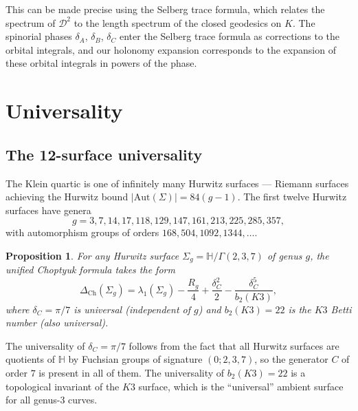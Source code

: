 \documentclass[12pt,a4paper]{article}
\newtheorem{proposition}[theorem]{Proposition}
\theoremstyle{definition}
\theoremstyle{remark}
\newcommand{\HH}{\mathbb{H}}
\newcommand{\Aut}{\mathrm{Aut}}
\newcommand{\cD}{\mathcal{D}}
\begin{document}
This can be made precise using the Selberg trace formula, which relates the spectrum of $\cD^2$ to the length spectrum of the closed geodesics on $K$. The spinorial phases $\delta_A$, $\delta_B$, $\delta_C$ enter the Selberg trace formula as corrections to the orbital integrals, and our holonomy expansion corresponds to the expansion of these orbital integrals in powers of the phase.

\section{Universality}
\label{sec:universality}

\subsection{The 12-surface universality}

The Klein quartic is one of infinitely many Hurwitz surfaces --- Riemann surfaces achieving the Hurwitz bound $|\Aut(\Sigma)| = 84(g-1)$. The first twelve Hurwitz surfaces have genera
\begin{equation}
g = 3, 7, 14, 17, 118, 129, 147, 161, 213, 225, 285, 357,
\end{equation}
with automorphism groups of orders $168, 504, 1092, 1344, \ldots$.

\begin{proposition}
\label{prop:universality}
For any Hurwitz surface $\Sigma_g = \HH/\Gamma(2,3,7)$ of genus $g$, the unified Choptyuk formula takes the form
\begin{equation}
\Delta_{\mathrm{Ch}}(\Sigma_g) = \lambda_1(\Sigma_g) - \frac{R_g}{4} + \frac{\delta_C^2}{2} - \frac{\delta_C^5}{b_2(K3)},
\end{equation}
where $\delta_C = \pi/7$ is \emph{universal} (independent of $g$) and $b_2(K3) = 22$ is the $K3$ Betti number (also universal).
\end{proposition}

The universality of $\delta_C = \pi/7$ follows from the fact that all Hurwitz surfaces are quotients of $\HH$ by Fuchsian groups of signature $(0; 2, 3, 7)$, so the generator $C$ of order $7$ is present in all of them. The universality of $b_2(K3) = 22$ is a topological invariant of the $K3$ surface, which is the ``universal'' ambient surface for all genus-$3$ curves.
\end{document}

